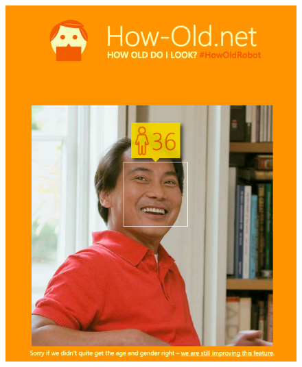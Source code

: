\documentclass{beamer}
\begin{document}
\begin{frame}[t]
\begin{minipage}[t]{0.45\linewidth}
\begin{figure}
    \includegraphics[width=0.8\linewidth]{holdold.png}
    \end{figure}
\end{minipage}

\end{frame}
\end{document}
